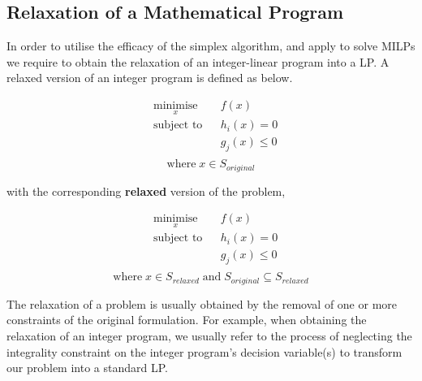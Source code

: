         
\subsection{Relaxation of a Mathematical Program}
\label{section: Appednix Relaxation}
In order to utilise the efficacy of the simplex algorithm, and apply to solve MILPs we require to obtain the relaxation of an integer-linear program into a LP. A relaxed version of an integer program is defined as below.

\begin{equation}
\begin{aligned}
& \underset{x}{\text{minimise}}
& & f(x) \\
& \text{subject to}
& & h_i(x) = 0 \\
& & & g_j(x) \leq 0 \\
\end{aligned}
\end{equation}
\[\text{where} \; x \in S_{original}\]

\noindent
with the corresponding \textbf{relaxed} version of the problem,\par

\begin{equation}
\begin{aligned}
& \underset{x}{\text{minimise}}
& & f(x) \\
& \text{subject to}
& & h_i(x) = 0 \\
& & & g_j(x) \leq 0 \\
\end{aligned}
\end{equation}
\[\text{where} \; x \in S_{relaxed} \; \text{and} \; S_{original} \subseteq S_{relaxed}\]

\vspace{\baselineskip}
\noindent
The relaxation of a problem is usually obtained by the removal of one or more constraints of the original formulation. For example, when obtaining the relaxation of an integer program, we usually refer to the process of neglecting the integrality constraint on the integer program's decision variable(s) to transform our problem into a standard LP.




